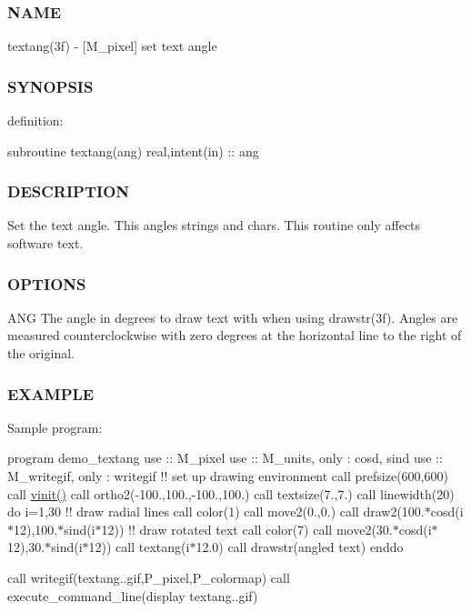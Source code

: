 \subsubsection*{N\+A\+ME}

textang(3f) -\/ \mbox{[}M\+\_\+pixel\mbox{]} set text angle 

\subsubsection*{S\+Y\+N\+O\+P\+S\+IS}

definition\+:

subroutine textang(ang) real,intent(in) \+:\+: ang

\subsubsection*{D\+E\+S\+C\+R\+I\+P\+T\+I\+ON}

Set the text angle. This angles strings and chars. This routine only affects software text.

\subsubsection*{O\+P\+T\+I\+O\+NS}

A\+NG The angle in degrees to draw text with when using drawstr(3f). Angles are measured counterclockwise with zero degrees at the horizontal line to the right of the original.

\subsubsection*{E\+X\+A\+M\+P\+LE}

Sample program\+:

program demo\+\_\+textang use \+:\+: M\+\_\+pixel use \+:\+: M\+\_\+units, only \+: cosd, sind use \+:\+: M\+\_\+writegif, only \+: writegif !! set up drawing environment call prefsize(600,600) call \hyperlink{namespacem__pixel_ac03ca8f23fdadb60599b6ea4dc87a6d9}{vinit()} call ortho2(-\/100.,100.,-\/100.,100.) call textsize(7.,7.) call linewidth(20) do i=1,30 !! draw radial lines call color(1) call move2(0.,0.) call draw2(100.$\ast$cosd(i$\ast$12),100.$\ast$sind(i$\ast$12)) !! draw rotated text call color(7) call move2(30.$\ast$cosd(i$\ast$12),30.$\ast$sind(i$\ast$12)) call textang(i$\ast$12.0) call drawstr(\textquotesingle{}angled text\textquotesingle{}) enddo

call writegif(\textquotesingle{}textang..\+gif\textquotesingle{},P\+\_\+pixel,P\+\_\+colormap) call execute\+\_\+command\+\_\+line(\textquotesingle{}display textang..\+gif\textquotesingle{})

